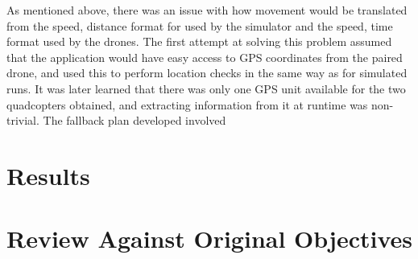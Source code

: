 As mentioned above, there was an issue with how movement would be translated from the {speed, distance} format for used by the simulator and the {speed, time} format used by the drones. The first attempt at solving this problem assumed that the application would have easy access to GPS coordinates from the paired drone, and used this to perform location checks in the same way as for simulated runs. It was later learned that there was only one GPS unit available for the two quadcopters obtained, and extracting information from it at runtime was non-trivial. The fallback plan developed involved 
\section{Results}
\section{Review Against Original Objectives}
